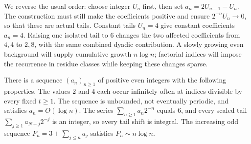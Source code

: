 \documentclass[11pt]{article}
\begin{document}
We reverse the usual order: choose integer $U_n$ first, then set
$a_n=2U_{n-1}-U_n$.  The construction must still make the coefficients
positive and ensure $2^{-n}U_n\to0$, so that these are actual tails.
Constant tails $U_n=4$ give
constant coefficients $a_n=4$.  Raising one isolated tail to $6$
changes the two affected coefficients from $4,4$ to $2,8$, with the
same combined dyadic contribution.  A slowly growing even background
will supply cumulative growth $n\log n$; factorial indices will impose
the recurrence in residue classes while keeping these changes sparse.

\begin{theorem}\label{long251:res:polignacfail}
There is a sequence $(a_n)_{n\ge1}$ of positive even integers with the
following properties.  The values $2$ and $4$ each occur infinitely often at
indices divisible by every fixed $t\ge1$.  The sequence is unbounded, not
eventually periodic, and satisfies $a_n=O(\log n)$.  The series
$\sum_{n\ge1}a_n2^{-n}$ equals $6$, and every scaled tail
$\sum_{j\ge1}a_{N+j}2^{-j}$ is an integer, so every tail shift is integral.
The increasing odd sequence $P_n=3+\sum_{j\le n}a_j$ satisfies
$P_n\sim n\log n$.
\end{theorem}
\end{document}
